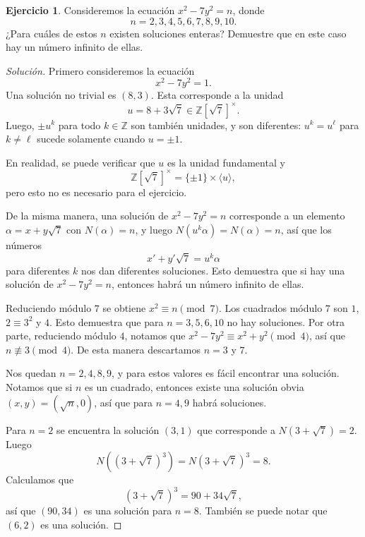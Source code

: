 \documentclass{article}
\newcounter{tarea}
\theoremstyle{definition}
\newtheorem{ejercicio}{Ejercicio}[tarea]
\newenvironment{solucion}{\begin{proof}[Solución]}{\end{proof}}
\begin{document}
\begin{ejercicio}
  Consideremos la ecuación $x^2 - 7y^2 = n$, donde
  $$n = 2,3,4,5,6,7,8,9,10.$$
  ¿Para cuáles de estos $n$ existen soluciones enteras?
  Demuestre que en este caso hay un número infinito de ellas.

  \ifdefined\solutions
  \begin{solucion}
    Primero consideremos la ecuación
    $$x^2 - 7y^2 = 1.$$
    Una solución no trivial es $(8, 3)$. Esta corresponde a la unidad
    $$u = 8 + 3\sqrt{7} \in \mathbb{Z} [\sqrt{7}]^\times.$$
    Luego,
    $\pm u^k$ para todo $k \in \mathbb{Z}$ son también unidades, y son
    diferentes: $u^k = u^\ell$ para $k\ne \ell$ sucede solamente
    cuando $u = \pm 1$.

    En realidad, se puede verificar que $u$ es la unidad fundamental y
    $$\mathbb{Z} [\sqrt{7}]^\times = \{ \pm 1 \} \times \langle u\rangle,$$
    pero esto no es necesario para el ejercicio.

    De la misma manera, una solución de $x^2 - 7y^2 = n$ corresponde a un
    elemento $\alpha = x + y\sqrt{7}$ con $N (\alpha) = n$, y luego
    $N (u^k \alpha) = N (\alpha) = n$, así que los números
    $$x' + y'\sqrt{7} = u^k \alpha$$
    para diferentes $k$ nos dan diferentes soluciones. Esto demuestra que
    si hay una solución de $x^2 - 7y^2 = n$, entonces habrá un número infinito
    de ellas.

    \vspace{1em}

    Reduciendo módulo $7$ se obtiene $x^2 \equiv n \pmod{7}$. Los cuadrados
    módulo $7$ son $1$, $2 \equiv 3^2$ y $4$. Esto demuestra que para
    $n = 3,5,6,10$ no hay soluciones. Por otra parte, reduciendo módulo $4$,
    notamos que $x^2 - 7y^2 \equiv x^2 + y^2 \pmod{4}$, así que
    $n \not\equiv 3\pmod{4}$.  De esta manera descartamos $n = 3$ y $7$.

    Nos quedan $n = 2,4,8,9$, y para estos valores es fácil encontrar una
    solución. Notamos que si $n$ es un cuadrado, entonces existe una solución
    obvia $(x,y) = (\sqrt{n}, 0)$, así que para $n = 4, 9$ habrá soluciones.

    Para $n = 2$ se encuentra la solución $(3,1)$ que corresponde a
    $N (3 + \sqrt{7}) = 2$. Luego
    $$N ((3 + \sqrt{7})^3) = N (3 + \sqrt{7})^3 = 8.$$
    Calculamos que
    $$(3 + \sqrt{7})^3 = 90 + 34\sqrt{7},$$
    así que $(90, 34)$ es una solución para $n = 8$. También se puede notar que
    $(6,2)$ es una solución.
  \end{solucion}
  \fi
\end{ejercicio}
\end{document}

